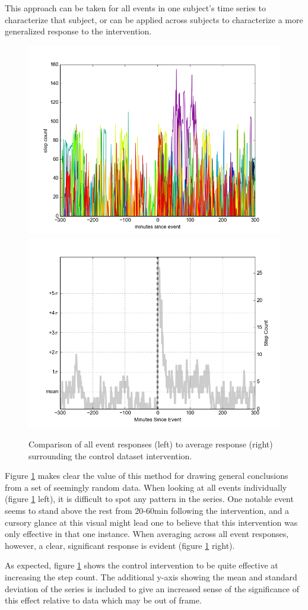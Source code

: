 \documentclass[preprint,journal]{vgtc}       %
\begin{document}
This approach can be taken for all events in one subject's time series to characterize that subject, or can be applied across subjects to characterize a more generalized response to the intervention.

\begin{figure}
\centering
\includegraphics[width=0.45\columnwidth]{./img/perfect_intervention_individual_events.png}
\includegraphics[width=0.45\columnwidth]{./img/perfect_intervention.png}
\caption{Comparison of all event responses (left) to average response (right) surrounding the control dataset intervention.}
\label{fig:interventionAverage}
\end{figure}	

Figure \ref{fig:interventionAverage} makes clear the value of this method for drawing general conclusions from a set of seemingly random data.
When looking at all events individually (figure \ref{fig:interventionAverage} left), it is difficult to spot any pattern in the series.
One notable event seems to stand above the rest from 20-60min following the intervention, and a cursory glance at this visual might lead one to believe that this intervention was only effective in that one instance.
When averaging across all event responses, however, a clear, significant response is evident (figure \ref{fig:interventionAverage} right).

As expected, figure \ref{fig:interventionAverage} shows the control intervention to be quite effective at increasing the step count.
The additional y-axis showing the mean and standard deviation of the series is included to give an increased sense of the significance of this effect relative to data which may be out of frame.
\end{document}
